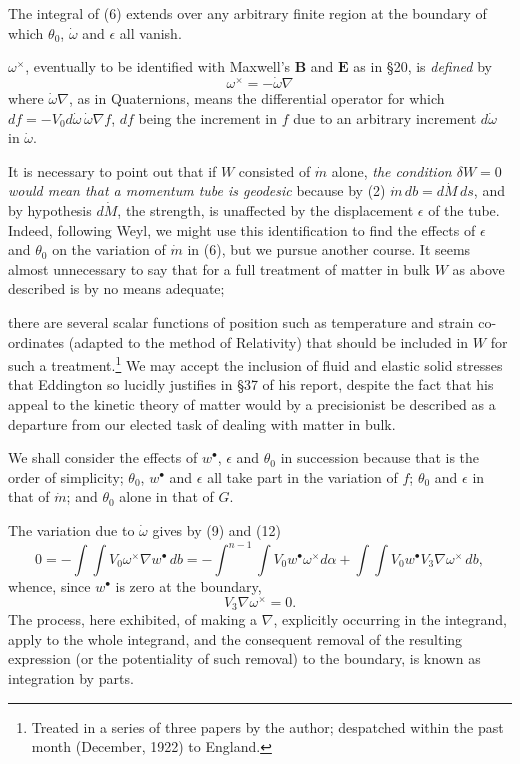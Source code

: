 \documentclass[11pt]{article}
\begin{document}
\indent The integral of (6) extends over any arbitrary finite region at the boundary of which $\theta_0$, $\dot\omega$ and $\epsilon$ all vanish.

\indent $\omega^\times$, eventually to be identified with Maxwell's $\mathbf{B}$ and $\mathbf{E}$ as in §20, is \emph{defined} by
\begin{equation}
  \omega^\times=-\dot\omega\nabla
  \tag{12}
\end{equation}
where $\dot\omega\nabla$, as in Quaternions, means the differential operator for which $df=-V_0d\dot\omega\,\dot\omega\nabla f$, $df$ being the increment in $f$ due to an arbitrary increment $d\dot\omega$ in $\dot\omega$.

\indent It is necessary to point out that if $W$ consisted of $\dot m$ alone, \emph{the condition $\delta W=0$ would mean that a momentum tube is geodesic} because by (2) $\dot m\,db=d\dot M\,ds$, and by hypothesis $d\dot M$, the strength, is unaffected by the displacement $\epsilon$ of the tube. Indeed, following Weyl, we might use this identification to find the effects of $\epsilon$ and $\theta_0$ on the variation of $\dot m$ in (6), but we pursue another course. It seems almost unnecessary to say that for a full treatment of matter in bulk $W$ as above described is by no means adequate;

there are several scalar functions of position such as temperature and strain co-ordinates (adapted to the method of Relativity) that should be included in $W$ for such a treatment.\footnote{Treated in a series of three papers by the author; despatched within the past month (December, 1922) to England.} We may accept the inclusion of fluid and elastic solid stresses that Eddington so lucidly justifies in §37 of his report, despite the fact that his appeal to the kinetic theory of matter would by a precisionist be described as a departure from our elected task of dealing with matter in bulk.

\indent We shall consider the effects of $w^\bullet$, $\epsilon$ and $\theta_0$ in succession because that is the order of simplicity; $\theta_0$, $w^\bullet$ and $\epsilon$ all take part in the variation of $f$; $\theta_0$ and $\epsilon$ in that of $\dot m$; and $\theta_0$ alone in that of $G$.

\indent The variation due to $\dot\omega$ gives by (9) and (12)
\[
  0=-\int\!\int V_0\omega^\times\nabla w^\bullet\,db
  =-\int^{n-1}\!\int V_0w^\bullet\omega^\times d\alpha
    +\int\!\int V_0w^\bullet V_3\nabla\omega^\times\,db,
\]
whence, since $w^\bullet$ is zero at the boundary,
\begin{equation}
  V_3\nabla\omega^\times=0.
  \tag{13}
\end{equation}
The process, here exhibited, of making a $\nabla$, explicitly occurring in the integrand, apply to the whole integrand, and the consequent removal of the resulting expression (or the potentiality of such removal) to the boundary, is known as integration by parts.
\end{document}
